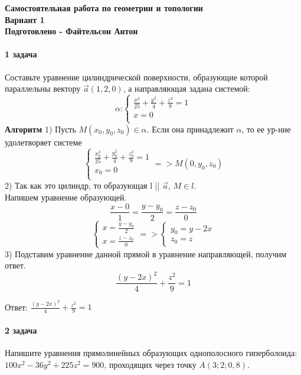 \documentclass[a4paper,14pt]{extreport} %
\begin{document}
  
\begin{center}
    \textbf{Самостоятельная работа по геометрии и топологии} \\
    \textbf{Вариант 1}\\
    \textbf{Подготовлено - Файтельсон Антон}
\end{center}

\noindent


\paragraph {1 задача}
 Составьте уравнение цилиндрической поверхности, образующие которой параллельны вектору $\vec{a} (1,2,0)$, а направляющая задана системой:
\[
  \alpha \text{:}
\begin{cases}
    \frac{x^2}{25} + \frac{y^2}{4}+ \frac{z^2}{9}= 1 \\
    x = 0\\
\end{cases}
\]
\textbf{Алгоритм}
1) Пусть $M(x_0, y_0, z_0) \in \alpha$.  Если она принадлежит $\alpha$, 
то ее ур-ние удолетворяет системе
\[  
\begin{cases}
    \frac{x_0^2}{25} + \frac{y_0^2}{4}+ \frac{z_0^2}{9}= 1 \\
    x_0 = 0\\
\end{cases}
=> M(0, y_0, z_0)
\]
2) Так как это цилиндр, то образующая l || $\vec{a}$, $M \in l$. \\ 
Напишем уравнение образующей. 
\[
  \frac{x-0}{1} = \frac{y-y_0}{2} = \frac{z-z_0}{0}
\]
\[
  \begin{cases}
     x = \frac{y-y_0}{2}\\ 
     x = \frac{z-z_0}{0}
  \end{cases} => 
  \begin{cases}
    y_0 = y - 2x \\ 
    z_0 = z
  \end{cases} 
\]
3) Подставим уравнение данной прямой в уравнение направляющей, получим ответ. 
\[
  \frac{(y-2x)^2}{4} + \frac{z^2}{9} = 1
\]

Ответ: $\frac{(y-2x)^2}{4} + \frac{z^2}{9} = 1$

\noindent
\paragraph {2 задача}
Напишите уравнения прямолинейных образующих однополосного гиперболоида: $100x^2 - 36y^2 + 225z^2 = 900$, проходящих через точку $A(3; 2; 0,8)$.
\end{document}
